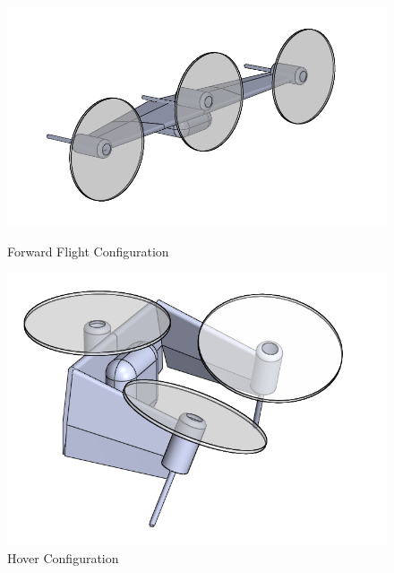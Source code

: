 \documentclass[]{aiaa-tc}%
\begin{document}
\begin{figure}[ht]
\centering
\begin{minipage}[b]{0.45\linewidth}
\includegraphics[width=1\textwidth]{pterodactylForward}
\caption{Forward Flight Configuration}
\label{fig:forward}
\end{minipage}
\quad
\begin{minipage}[b]{0.45\linewidth}
\includegraphics[width=1\textwidth]{pterodactylHover}
\caption{Hover Configuration}
\label{fig:hover}
\end{minipage}
\end{figure}
\end{document}
